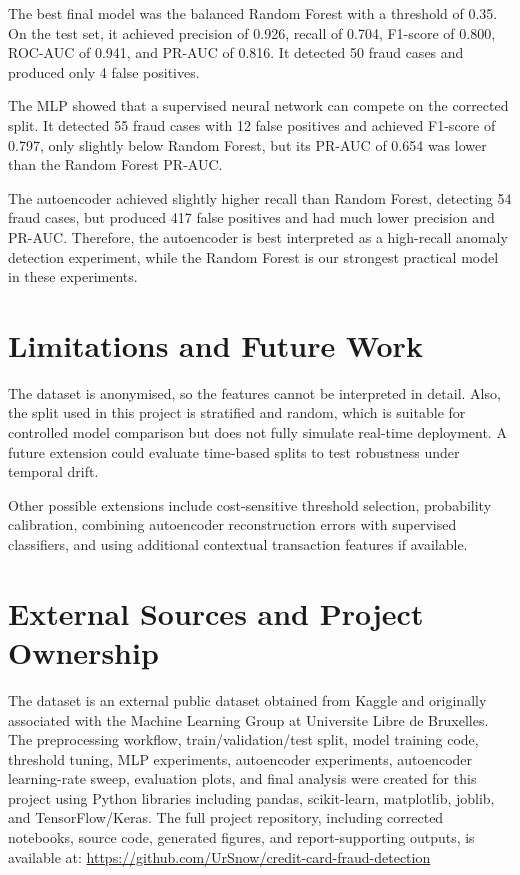 \documentclass[12pt,a4paper]{report}
\begin{document}
The best final model was the balanced Random Forest with a threshold of 0.35. On the test set, it achieved precision of 0.926, recall of 0.704, F1-score of 0.800, ROC-AUC of 0.941, and PR-AUC of 0.816. It detected 50 fraud cases and produced only 4 false positives.

The MLP showed that a supervised neural network can compete on the corrected split. It detected 55 fraud cases with 12 false positives and achieved F1-score of 0.797, only slightly below Random Forest, but its PR-AUC of 0.654 was lower than the Random Forest PR-AUC.

The autoencoder achieved slightly higher recall than Random Forest, detecting 54 fraud cases, but produced 417 false positives and had much lower precision and PR-AUC. Therefore, the autoencoder is best interpreted as a high-recall anomaly detection experiment, while the Random Forest is our strongest practical model in these experiments.

\section{Limitations and Future Work}

The dataset is anonymised, so the features cannot be interpreted in detail. Also, the split used in this project is stratified and random, which is suitable for controlled model comparison but does not fully simulate real-time deployment. A future extension could evaluate time-based splits to test robustness under temporal drift.

Other possible extensions include cost-sensitive threshold selection, probability calibration, combining autoencoder reconstruction errors with supervised classifiers, and using additional contextual transaction features if available.

\section{External Sources and Project Ownership}

The dataset is an external public dataset obtained from Kaggle and originally associated with the Machine Learning Group at Universite Libre de Bruxelles. The preprocessing workflow, train/validation/test split, model training code, threshold tuning, MLP experiments, autoencoder experiments, autoencoder learning-rate sweep, evaluation plots, and final analysis were created for this project using Python libraries including pandas, scikit-learn, matplotlib, joblib, and TensorFlow/Keras.
The full project repository, including corrected notebooks, source code, generated figures, and report-supporting outputs, is available at:
\url{https://github.com/UrSnow/credit-card-fraud-detection}
\end{document}
